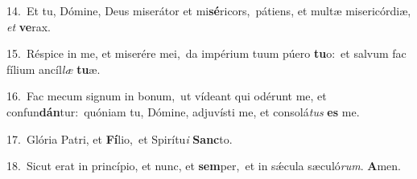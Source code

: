 {\numbfont\textcolor{\numbcolor}{14.}}~Et tu, Dómine, Deus miserátor et mi\-\textbf{sé}\-ricors,~\star pátiens, et multæ misericórdiæ, \textit{et} \textbf{ve}\-rax.\par
{\numbfont\textcolor{\numbcolor}{15.}}~Réspice in me, et miserére mei,~\dagger da impérium tuum púero \textbf{tu}\-o:~\star et salvum fac fílium ancíl\textit{læ} \textbf{tu}\-æ.\par
{\numbfont\textcolor{\numbcolor}{16.}}~Fac mecum signum in bonum,~\dagger ut vídeant qui odérunt me, et confun\-\textbf{dán}\-tur:~\star quóniam tu, Dómine, adjuvísti me, et consolá\textit{tus} \textbf{es} me.\par
{\numbfont\textcolor{\numbcolor}{17.}}~Glória Patri, et \textbf{Fí}\-lio,~\star et Spirítu\textit{i} \textbf{Sanc}\-to.\par
{\numbfont\textcolor{\numbcolor}{18.}}~Sicut erat in princípio, et nunc, et \textbf{sem}\-per,~\star et in sǽcula sæculó\-\textit{rum}\-. \textbf{A}\-men.\par
